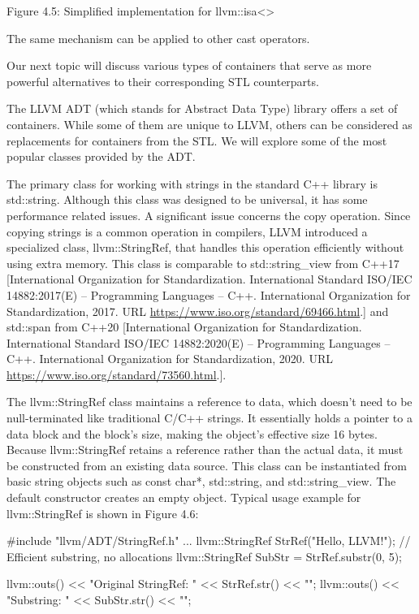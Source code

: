 \begin{center}
Figure 4.5: Simplified implementation for llvm::isa<>
\end{center}

The same mechanism can be applied to other cast operators.

Our next topic will discuss various types of containers that serve as more powerful alternatives to their corresponding STL counterparts.


The LLVM ADT (which stands for Abstract Data Type) library offers a set of containers. While some of them are unique to LLVM, others can be considered as replacements for containers from the STL. We will explore some of the most popular classes provided by the ADT.


The primary class for working with strings in the standard C++ library is std::string. Although this class was designed to be universal, it has some performance related issues. A significant issue concerns the copy operation. Since copying strings is a common operation in compilers, LLVM introduced a specialized class, llvm::StringRef, that handles this operation efficiently without using extra memory. This class is comparable to std::string\_view from C++17 [International Organization for Standardization. International Standard ISO/IEC 14882:2017(E) – Programming Languages – C++. International Organization for Standardization, 2017. URL \url{https://www.iso.org/standard/69466.html}.] and std::span from C++20 [International Organization for Standardization. International Standard ISO/IEC 14882:2020(E) – Programming Languages – C++. International Organization for Standardization, 2020. URL \url{https://www.iso.org/standard/73560.html}.].

The llvm::StringRef class maintains a reference to data, which doesn’t need to be null-terminated like traditional C/C++ strings. It essentially holds a pointer to a data block and the block’s size, making the object’s effective size 16 bytes. Because llvm::StringRef retains a reference rather than the actual data, it must be constructed from an existing data source. This class can be instantiated from basic string objects such as const char*, std::string, and std::string\_view. The default constructor creates an empty object. Typical usage example for llvm::StringRef is shown in Figure 4.6:

\begin{cpp}
#include "llvm/ADT/StringRef.h"
...
llvm::StringRef StrRef("Hello, LLVM!");
// Efficient substring, no allocations
llvm::StringRef SubStr = StrRef.substr(0, 5);

llvm::outs() << "Original StringRef: " << StrRef.str() << "\n";
llvm::outs() << "Substring: " << SubStr.str() << "\n";
\end{cpp}

